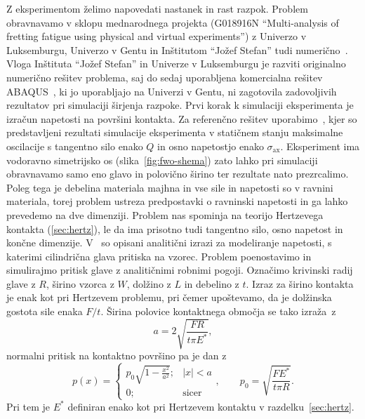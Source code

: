 \documentclass[12pt,a4paper,twoside]{article}
\theoremstyle{definition} %
\theoremstyle{plain} %
\numberwithin{equation}{section}
\newcommand{\sax}{\ensuremath{\sigma_{\text{ax}}}}
\begin{document}
Z eksperimentom želimo napovedati nastanek in rast razpok. Problem obravnavamo v sklopu mednarodnega
projekta (G018916N ``Multi-analysis of fretting fatigue using physical and virtual experiments'') z
Univerzo v Luksemburgu, Univerzo v Gentu in Inštitutom ``Jožef Stefan''  tudi
numerično~\cite{pereira2016convergence}. Vloga Inštituta ``Jožef Stefan'' in Univerze v Luksemburgu
je razviti originalno numerično rešitev problema, saj do sedaj uporabljena komercialna rešitev
ABAQUS\textregistered~\cite{hibbitt2001abaqus}, ki jo uporabljajo na Univerzi v Gentu, ni zagotovila
zadovoljivih rezultatov pri simulaciji širjenja razpoke. Prvi korak k simulaciji eksperimenta je
izračun napetosti na površini kontakta. Za referenčno rešitev
uporabimo~\cite{pereira2016convergence}, kjer so predstavljeni rezultati simulacije eksperimenta v
statičnem stanju maksimalne oscilacije s tangentno silo enako $Q$ in osno napetostjo enako $\sax$.
Eksperiment ima vodoravno simetrijsko os (slika~\ref{fig:fwo-shema}) zato lahko pri simulaciji
obravnavamo samo eno glavo in polovično širino ter rezultate nato prezrcalimo. Poleg tega je
debelina materiala majhna in vse sile in napetosti so v ravnini materiala, torej problem ustreza
predpostavki o ravninski napetosti in ga lahko prevedemo na dve dimenziji. Problem nas spominja na
teorijo Hertzevega kontakta (\ref{sec:hertz}), le da ima prisotno tudi tangentno silo, osno napetost
in končne dimenzije. V~\cite[razdelek 2]{pereira2016convergence} so opisani analitični izrazi za
modeliranje napetosti, s katerimi cilindrična glava pritiska na vzorec. Problem poenostavimo in
simulirajmo pritisk glave z analitičnimi robnimi pogoji.  Označimo krivinski radij glave z $R$,
širino vzorca z $W$, dolžino z $L$ in debelino z $t$. Izraz za širino kontakta je enak kot pri
Hertzevem problemu, pri čemer upoštevamo, da je dolžinska gostota sile enaka $F/t$. Širina polovice
kontaktnega območja se tako izraža~z
\begin{equation}
   a = 2\sqrt{\frac{FR}{t \pi E^\ast}},
\end{equation}
normalni pritisk na kontaktno površino pa je dan z
\begin{equation}
  p(x) = \begin{cases}
    p_0 \sqrt{1-\frac{x^2}{a^2}}; & |x| < a \\
    0; & \text{sicer}
  \end{cases}, \qquad p_0 = \sqrt{\frac{FE^\ast}{t \pi R}}.
\end{equation}
Pri tem je $E^\ast$ definiran enako kot pri Hertzevem kontaktu v razdelku~\ref{sec:hertz}.
\end{document}
